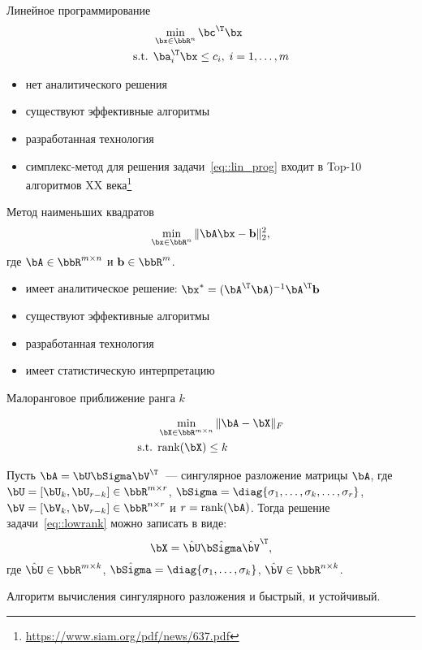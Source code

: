 \documentclass[12pt]{beamer}
\begin{document}
\begin{frame}{Линейное программирование}
\begin{equation}
\begin{split}
&\min\limits_{\bx \in \bbR^n} \bc^{\T}\bx\\
\text{s.t. } & \ba^{\T}_i \bx \leq c_i, \; i = 1,\ldots, m
\end{split}
\label{eq::lin_prog}
\end{equation}
\begin{itemize}
\item нет аналитического решения
\item существуют эффективные алгоритмы
\item разработанная технология
\item симплекс-метод для решения задачи~\eqref{eq::lin_prog} входит в Top-10 алгоритмов XX века\footnote{\url{https://www.siam.org/pdf/news/637.pdf}}
\end{itemize}
\end{frame}

\begin{frame}{Метод наименьших квадратов}
\begin{equation}
\min\limits_{\bx \in \bbR^n} \|\bA\bx - \mathbf{b} \|^2_2,
\label{eq::least_sq}
\end{equation}
где $\bA \in \bbR^{m \times n}$ и $\mathbf{b} \in \bbR^m$.
\begin{itemize}
\item имеет аналитическое решение: $\bx^* = (\bA^{\T}\bA)^{-1}\bA^{\T}\mathbf{b}$
\item существуют эффективные алгоритмы
\item разработанная технология
\item имеет статистическую интерпретацию
\end{itemize}
\end{frame}

\begin{frame}{Малоранговое приближение ранга $k$}

\begin{equation}
\begin{split}
&\min\limits_{\bX \in \bbR^{m \times n}} \|\bA - \bX \|_F \\
\text{s.t. } & \text{rank}(\bX) \leq k
\end{split}
\label{eq::lowrank}
\end{equation}

\begin{Theorem}
Пусть $\bA = \bU\bSigma\bV^{\T}$~--- сингулярное разложение матрицы $\bA$, где $\bU = [\bU_k, \bU_{r-k}] \in \bbR^{m \times r}$, $\bSigma = \diag{\sigma_1, \ldots, \sigma_k, \ldots, \sigma_r}$, $\bV = [\bV_k, \bV_{r - k}] \in \bbR^{n \times r}$ и $r = \text{rank}(\bA)$.  Тогда решение задачи~\eqref{eq::lowrank} можно записать в виде:
\[
\bX = \hat{\bU} \hat{\bSigma} \hat{\bV}^{\T},
\]
где $\hat{\bU} \in \bbR^{m \times k}$, $\hat{\bSigma} = \diag{\sigma_1, \ldots, \sigma_k}$, $\hat{\bV} \in \bbR^{n \times k}$.
\end{Theorem}
\small Алгоритм вычисления сингулярного разложения и быстрый, и устойчивый.
\end{frame}
\end{document}
